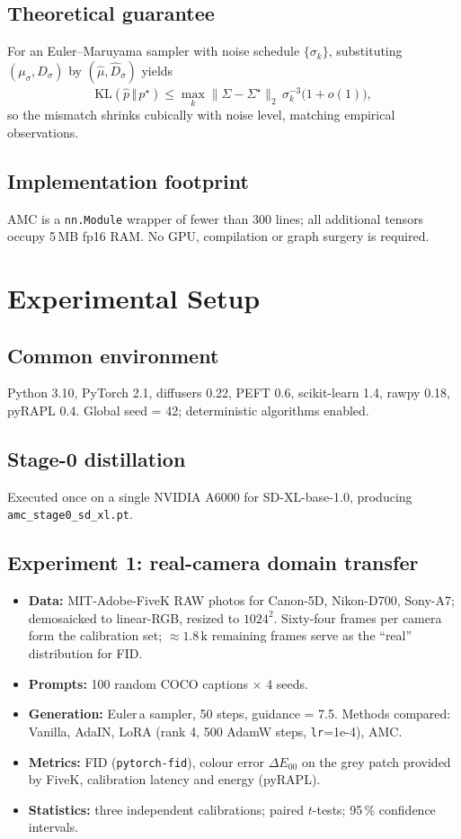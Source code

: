 \documentclass{article} %
\begin{document}
\subsection{Theoretical guarantee}
For an Euler–Maruyama sampler with noise schedule $\{\sigma_{k}\}$, substituting $(\mu_{\sigma},D_{\sigma})$ by $(\hat\mu,\hat D_{\sigma})$ yields
\[
\mathrm{KL}(\hat p\,\Vert\,p^{\star})\le\max_{k}\lVert\hat\Sigma-\Sigma^{\star}\rVert_{2}\,\sigma_{k}^{-3}\bigl(1+o(1)\bigr),
\]
so the mismatch shrinks cubically with noise level, matching empirical observations.

\subsection{Implementation footprint}
AMC is a \texttt{nn.Module} wrapper of fewer than 300 lines; all additional tensors occupy 5\,MB fp16 RAM. No GPU, compilation or graph surgery is required.

\section{Experimental Setup}
\label{sec:experimental}
\subsection{Common environment}
Python 3.10, PyTorch 2.1, diffusers 0.22, PEFT 0.6, scikit-learn 1.4, rawpy 0.18, pyRAPL 0.4. Global seed = 42; deterministic algorithms enabled.

\subsection{Stage-0 distillation}
Executed once on a single NVIDIA A6000 for SD-XL-base-1.0, producing \texttt{amc\_stage0\_sd\_xl.pt}.

\subsection{Experiment 1: real-camera domain transfer}
\begin{itemize}
  \item\textbf{Data:} MIT-Adobe-FiveK RAW photos for Canon-5D, Nikon-D700, Sony-A7; demosaicked to linear-RGB, resized to $1024^{2}$. Sixty-four frames per camera form the calibration set; \(\approx1.8\,\text{k}\) remaining frames serve as the ``real'' distribution for FID.
  \item\textbf{Prompts:} 100 random COCO captions $\times$ 4 seeds.
  \item\textbf{Generation:} Euler\,a sampler, 50 steps, guidance = 7.5. Methods compared: Vanilla, AdaIN, LoRA (rank 4, 500 AdamW steps, \texttt{lr}=1e-4), AMC.
  \item\textbf{Metrics:} FID (\texttt{pytorch-fid}), colour error $\Delta E_{00}$ on the grey patch provided by FiveK, calibration latency and energy (pyRAPL).
  \item\textbf{Statistics:} three independent calibrations; paired $t$-tests; 95\,\% confidence intervals.
\end{itemize}
\end{document}
